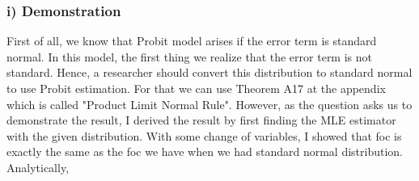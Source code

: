 \documentclass[11pt]{article}
\begin{document}
\subsubsection*{i) Demonstration}
First of all, we know that Probit model arises if the error term is standard normal. In this model, the first thing we realize that the error term is not standard. Hence, a researcher should convert this distribution to standard normal to use Probit estimation. For that we can use Theorem A17 at the appendix which is called "Product Limit Normal Rule". However, as the question asks us to demonstrate the result, I derived the result by first finding the MLE estimator with the given distribution. With some change of variables, I showed that foc is exactly the same as the foc we have when we had standard normal distribution. Analytically, 
\end{document}
